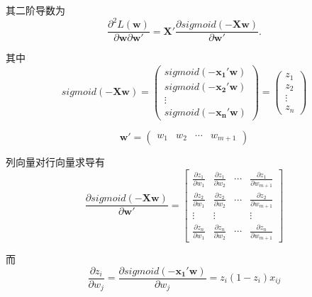 \documentclass[withoutpreface,bwprint]{cumcmthesis}
\begin{document}
其二阶导数为
\begin{equation*}
\frac{\partial^{2}{L(\boldsymbol{w})}}{\partial{\boldsymbol{w}}\partial{\boldsymbol{w'}}}=\boldsymbol{X'}\frac{\partial{sigmoid(-\boldsymbol{Xw})}}{\partial{\boldsymbol{w'}}}.
\end{equation*}

其中
\begin{equation*}
sigmoid(-\boldsymbol{Xw})=\begin{pmatrix}
sigmoid(-\boldsymbol{x_{1}'w})\\sigmoid(-\boldsymbol{x_{2}'w})\\ \vdots\\ sigmoid(-\boldsymbol{x_{n}'w})
\end{pmatrix}
=\begin{pmatrix}
z_{1}\\ z_{2} \\ \vdots \\ z_{n}
\end{pmatrix}
\end{equation*}


\begin{equation*}
\boldsymbol{w'}=\begin{pmatrix}
w_{1}&w_{2}&\cdots&w_{m+1}\end{pmatrix}
\end{equation*}

列向量对行向量求导有
\begin{equation}
\frac{\partial{sigmoid(-\boldsymbol{Xw})}}{\partial{\boldsymbol{w'}}}=
\begin{bmatrix}
\frac{\partial{z_{1}}}{\partial{w_{1}}}&\frac{\partial{z_{1}}}{\partial{w_{2}}}&\cdots&\frac{\partial{z_{1}}}{\partial{w_{m+1}}}\\
\frac{\partial{z_{2}}}{\partial{w_{1}}}&\frac{\partial{z_{2}}}{\partial{w_{2}}}&\cdots&\frac{\partial{z_{2}}}{\partial{w_{m+1}}}\\
\vdots&\vdots& &\vdots\\
\frac{\partial{z_{n}}}{\partial{w_{1}}}&\frac{\partial{z_{n}}}{\partial{w_{2}}}&\cdots&\frac{\partial{z_{n}}}{\partial{w_{m+1}}}
\end{bmatrix}
\end{equation}

而
\begin{equation*}
\frac{\partial{z_{i}}}{\partial{w_{j}}}=\frac{\partial{sigmoid(-\boldsymbol{x_{1}'w})}}{\partial{w_{j}}}=z_{i}(1-z_{i})x_{ij}
\end{equation*}
\end{document}
